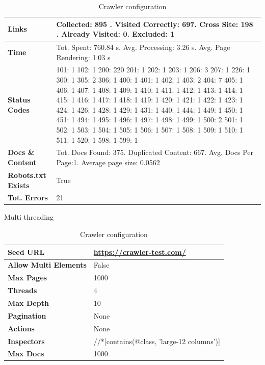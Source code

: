 {\begin{table}[ht] 
{\footnotesize
\begin{tabular}{ P{3cm} ||P{10.1cm}  }      %
 \hline \hline
\textbf{Links} & Collected: 895 . Visited Correctly: 697. Cross Site: 198 . Already Visited: 0. Excluded: 1\T\B 
\\ 
\hline
\textbf{Time} & Tot. Spent: 760.84 s. Avg. Processing: 3.26 s. Avg. Page Rendering: 1.03 s\T\B 
\\
\hline
\textbf{Status Codes} &     101: 1  102: 1  200: 220  201: 1  202: 1  203: 1  206: 3  207: 1  226: 1  300: 1  305: 2  306: 1  400: 1  401: 1  402: 1  403: 2  404: 7  405: 1  406: 1  407: 1  408: 1  409: 1  410: 1  411: 1  412: 1  413: 1  414: 1  415: 1  416: 1  417: 1  418: 1  419: 1  420: 1  421: 1  422: 1  423: 1  424: 1  426: 1  428: 1  429: 1  431: 1  440: 1  444: 1  449: 1  450: 1  451: 1  494: 1  495: 1  496: 1  497: 1  498: 1  499: 1  500: 2  501: 1  502: 1  503: 1  504: 1  505: 1  506: 1  507: 1  508: 1  509: 1  510: 1  511: 1  520: 1  598: 1  
599: 1\T\B 
\\ 
\hline
\textbf{Docs \& Content} & Tot. Docs Found: 375. Duplicated Content: 667. Avg. Docs Per Page:1. Average page size: 0.0562\T\B 
\\ 
\hline
\textbf{Robots.txt Exists} & True\T\B 
\\ 
\hline
\textbf{Tot. Errors} & 21\T\B 
\\ 
\hline \hline
    \end{tabular}
}
  \captionsetup{justification=centering,margin=2cm}
  \caption{Crawler configuration}
\end{table}


Multi threading


\begin{table}[ht] 
{\footnotesize
\begin{tabular}{ P{3cm} ||P{10.1cm}  }      %
 \hline \hline
\textbf{Seed URL} & \href{https://crawler-test.com/}{https://crawler-test.com/}\T\B 
\\ 
\hline
\textbf{Allow Multi Elements} & False \T\B 
\\ 
\hline
\textbf{Max Pages} & 1000\T\B 
\\ 
\hline
\textbf{Threads} & 4\T\B 
\\ 
\hline
\textbf{Max Depth} & 10\T\B 
\\ 
\hline
\textbf{Pagination} & None\T\B 
\\ 
\hline
\textbf{Actions} & None\T\B 
\\ 
\hline
\textbf{Inspectors} & //*[contains(@class, 'large-12 columns')]\T\B 
\\ 
\hline
\textbf{Max Docs} & 1000\T\B 
\\ 
\hline \hline
    \end{tabular}
}
  \captionsetup{justification=centering,margin=2cm}
  \caption{Crawler configuration}
\end{table}



}
